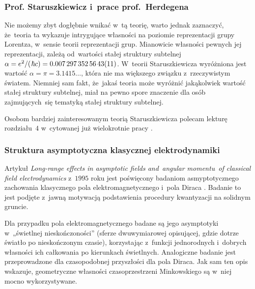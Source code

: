 \documentclass[10pt,t]{beamer}
\begin{document}
\begin{frame}
  \frametitle{Prof. Staruszkiewicz i~prace prof.~Herdegena}


  Nie możemy zbyt dogłębnie wnikać w~tą teorię, warto jednak zaznaczyć,
  że~teoria ta wykazuje intrygujące własności na poziomie reprezentacji
  grupy Lorentza, w~sensie teorii reprezentacji grup. Mianowicie własności
  pewnych jej reprezentacji, zależą od~wartości stałej struktury subtelnej
  $\alpha = e^{ 2 } / ( \hspace{0.09em} \hbar c ) =
  0.007 \, 297 \, 352 \, 56 \, 43(11)$. W~teorii Staruszkiewicza
  wyróżniona jest wartość $\alpha = \pi = 3.1415\ldots$, która nie ma większego związku
  z~rzeczywistym światem. Niemniej sam fakt, że~jakaś teoria może wyróżnić
  jakąkolwiek wartość stałej struktury subtelnej, miał na pewno spore
  znaczenie dla osób zajmujących~się tematyką stałej struktury subtelnej.

  Osobom bardziej zainteresowanym teorią Staruszkiewicza polecam lekturę
  rozdziału~$4$ w~cytowanej już wielokrotnie pracy
  \parencite{Herdegen-Infrared-structure-beyond-locality-ETC-Ver-2024}.

\end{frame}





\begin{frame}
  \frametitle{Struktura asymptotyczna klasycznej elektrodynamiki}


  Artykuł 
  {\textit{Long-range effects in asymptotic fields and~angular momentu~of
      classical field electrodynamics}} z~$1995$ roku jest poświęcony
  badaniom asmyptotycznego zachowania klasycznego pola elektromagnetycznego
  i~pola Diraca
  \parencite{Herdegen-Long-range-effects-in-asymptotic-ETC-Pub-1995}.
  Badanie to jest podjęte z~jawną motywacją podstawienia procedury
  kwantyzacji na solidnym gruncie.

  Dla przypadku pola elektromagnetycznego badane są jego asymptotyki
  w~„świetlnej nieskończoności” (sferze dwuwymiarowej opisującej, gdzie
  dotrze światło po nieskończonym czasie), korzystając z~funkcji
  jednorodnych i~dobrych własności ich całkowania po kierunkach świetlnych.
  Analogiczne badanie jest przeprowadzone dla czasopodobnej przyszłości dla
  pola Diraca. Jak sam ten opis wskazuje, geometryczne własności
  czasoprzestrzeni Minkowskiego są w~niej mocno wykorzystywane.

\end{frame}
\end{document}

